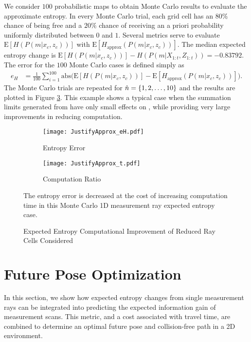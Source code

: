 We consider $100$ probabilistic maps to obtain Monte Carlo results to evaluate the approximate entropy. In every Monte Carlo trial, each grid cell has an $80\%$ chance of being free and a $20\%$ chance of receiving an a priori probability uniformly distributed between $0$ and $1$. 
Several metrics serve to evaluate $\text{E}[H(P(m|x_c,z_{c}))]$ with $\text{E}[H_\text{approx}(P(m|x_c,z_{c}))]$. The median expected entropy change is $\text{E}[H(P(m|x_c,z_{c}))]-H(P(m|X_{1:t},Z_{1:t}))=-0.83792$. The error for the $100$ Monte Carlo cases is defined simply as
\begin{align}
e_{H}&=\frac1{100}\sum_{i=1}^{100}\text{abs}\bigg(\text{E}[H(P(m|x_c,z_{c}))]-\text{E}[H_\text{approx}(P(m|x_c,z_{c}))]\bigg).
\end{align}
The Monte Carlo trials are repeated for $\hat n=\left\{ 1,2,\ldots,10 \right\}$ and the results are plotted in Figure \ref{fig:ApproxJust}.
This example shows a typical case when the summation limits generated from  have only small effects on , while providing very large improvements in reducing computation.

\begin{figure}
	\centering
    	\begin{subfigure}[b]{0.45\textwidth}
        		\texttt{[image: JustifyApprox\_eH.pdf]}
        		\caption{Entropy Error}
        		\label{fig:H_err}
    	\end{subfigure}
	\begin{subfigure}[b]{0.45\textwidth}
        		\texttt{[image: JustifyApprox\_t.pdf]}
        		\caption{Computation Ratio}
        		\label{fig:H_comp_ratio}
    	\end{subfigure}
	\caption{Expected Entropy Computational Improvement of Reduced Ray Cells Considered}
	\medskip
	\small
	The entropy error is decreased at the cost of increasing computation time in this Monte Carlo 1D measurement ray expected entropy case.
	\label{fig:ApproxJust}
\end{figure}





\section{Future Pose Optimization}

In this section, we show how expected entropy changes from single measurement rays can be integrated into predicting the expected information gain of measurement scans. This metric, and a cost associated with travel time, are combined to determine an optimal future pose and collision-free path in a 2D environment.


